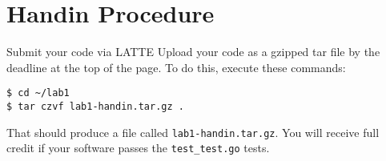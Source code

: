 \documentclass{article}
\newcommand{\code}{\texttt}
\begin{document}
\section{Handin Procedure}
Submit your code via LATTE
Upload your code as a gzipped tar file by the deadline at the top of the page. To do this, execute these commands:
\begin{lstlisting}
$ cd ~/lab1
$ tar czvf lab1-handin.tar.gz .
\end{lstlisting}
That should produce a file called \code{lab1-handin.tar.gz}.
You will receive full credit if your software passes the \code{test\_test.go} tests.
\end{document}
